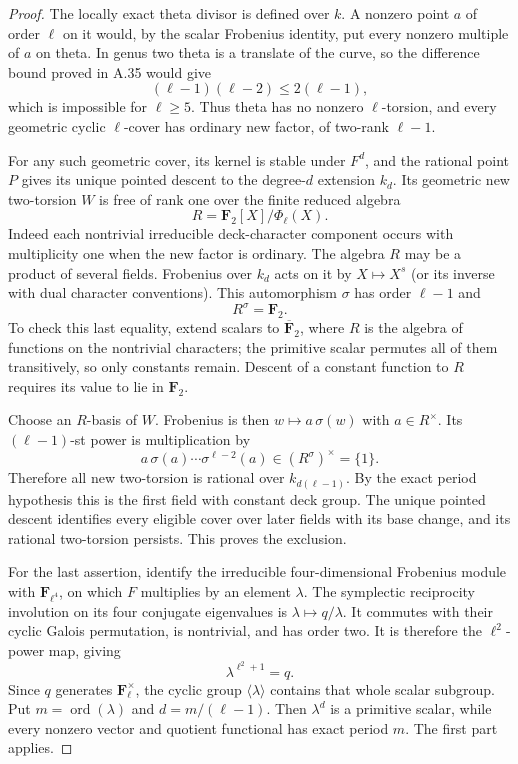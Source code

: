 \documentclass[11pt]{article}
\begin{document}
\begin{proof}
The locally exact theta divisor is defined over \(k\).
A nonzero point \(a\) of order \(\ell\) on it would, by the
scalar Frobenius identity, put every nonzero multiple of \(a\)
on theta. In genus two theta is a translate of the curve,
so the difference bound proved in A.35 would give
\[
                    (\ell-1)(\ell-2)\le2(\ell-1),
\]
which is impossible for \(\ell\ge5\).
Thus theta has no nonzero \(\ell\)-torsion, and every geometric
cyclic \(\ell\)-cover has ordinary new factor, of two-rank
\(\ell-1\).

For any such geometric cover, its kernel is stable under
\(F^d\), and the rational point \(P\) gives its unique pointed
descent to the degree-\(d\) extension \(k_d\).
Its geometric new two-torsion \(W\) is free of rank one over
the finite reduced algebra
\[
              R=\mathbf F_2[X]/\Phi_\ell(X).
\]
Indeed each nontrivial irreducible deck-character component
occurs with multiplicity one when the new factor is ordinary.
The algebra \(R\) may be a product of several fields.
Frobenius over \(k_d\) acts on it by \(X\mapsto X^s\)
(or its inverse with dual character conventions).
This automorphism \(\sigma\) has order \(\ell-1\) and
\[
                              R^\sigma=\mathbf F_2.
\]
To check this last equality, extend scalars to
\(\overline{\mathbf F}_2\), where \(R\) is the algebra of
functions on the nontrivial characters; the primitive scalar
permutes all of them transitively, so only constants remain.
Descent of a constant function to \(R\) requires its value to
lie in \(\mathbf F_2\).

Choose an \(R\)-basis of \(W\). Frobenius is then
\(w\mapsto a\,\sigma(w)\) with \(a\in R^\times\).
Its \((\ell-1)\)-st power is multiplication by
\[
                 a\,\sigma(a)\cdots\sigma^{\ell-2}(a)
                         \in(R^\sigma)^\times=\{1\}.
\]
Therefore all new two-torsion is rational over
\(k_{d(\ell-1)}\). By the exact period hypothesis this is the
first field with constant deck group. The unique pointed
descent identifies every eligible cover over later fields
with its base change, and its rational two-torsion persists.
This proves the exclusion.

For the last assertion, identify the irreducible
four-dimensional Frobenius module with
\(\mathbf F_{\ell^4}\), on which \(F\) multiplies by an
element \(\lambda\).
The symplectic reciprocity involution on its four conjugate
eigenvalues is \(\lambda\mapsto q/\lambda\).
It commutes with their cyclic Galois permutation, is nontrivial,
and has order two. It is therefore the \(\ell^2\)-power map,
giving
\[
                         \lambda^{\ell^2+1}=q.
\]
Since \(q\) generates \(\mathbf F_\ell^\times\),
the cyclic group \(\langle\lambda\rangle\) contains that whole
scalar subgroup. Put \(m=\operatorname{ord}(\lambda)\) and
\(d=m/(\ell-1)\). Then \(\lambda^d\) is a primitive scalar,
while every nonzero vector and quotient functional has exact
period \(m\). The first part applies.
\end{proof}
\end{document}
